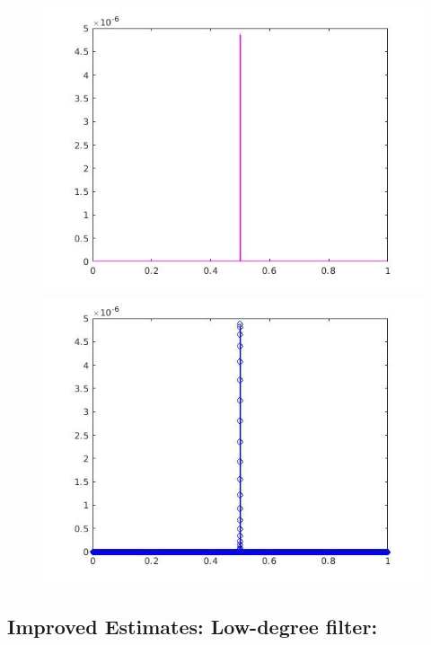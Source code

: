 \documentclass[a4paper,11pt]{article}
\begin{document}
\begin{figure}[!hp]
\centering
\begin{minipage}{.5\textwidth}
  \centering
  \includegraphics[width=1\linewidth]{images/lab2_45.jpg}
\end{minipage}%
\begin{minipage}{.5\textwidth}
  \centering
  \includegraphics[width=1\linewidth]{images/lab2_46.jpg}
\end{minipage}
\end{figure}

\newpage

\subsection{Improved Estimates: Low-degree filter:}
\end{document}
